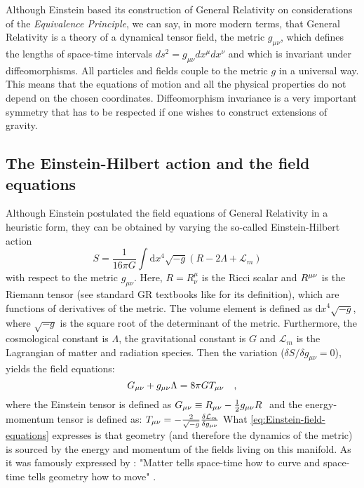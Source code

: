 Although Einstein based its construction of General Relativity on considerations of the \emph{Equivalence Principle},  we can say, in more modern terms, that General Relativity is a theory of 
a dynamical tensor field, the metric $g_{\mu \nu}$, which defines the lengths 
of space-time intervals $ds^2 = g_{\mu \nu} dx^{\mu} dx^{\nu}$ and which is invariant under diffeomorphisms. 
All particles and fields couple to the metric $g$ in a universal way.
This means that the equations of motion and all the physical properties do not depend on the chosen coordinates.
Diffeomorphism invariance is a very important symmetry that has to be respected if one wishes to construct
extensions of gravity. 



\subsection{The Einstein-Hilbert action and the field equations \label{sub:Einstein-Hilbert}}

Although Einstein postulated the field equations of General Relativity in a heuristic
form, they can be obtained by varying the so-called Einstein-Hilbert action
\begin{equation}\label{eq:Einstein-Hilbert action}
S = \frac{1}{16 \pi G} \int \textrm{d}x^4 \sqrt{-g}\left( R - 2\Lambda + \mathcal{L}_m \right) \quad 
\end{equation}
with respect to the metric $g_{\mu \nu}$.
Here, $R=R^\mu_\nu$ is the Ricci scalar and $R^{\mu \nu}$ is the Riemann tensor (see standard GR textbooks like \cite{wald} for its definition), 
which are functions of derivatives of the metric. The volume element is defined as $\textrm{d}x^4 \sqrt{-g}$, where
$\sqrt{-g}$ is the square root of the determinant of the metric.
Furthermore, the cosmological constant is $\Lambda$, the gravitational constant is $G$ and $\mathcal{L}_m $ is the Lagrangian of matter and radiation species.
Then the variation ($\delta S / \delta g_{\mu \nu} = 0$), yields the field equations:
\begin{equation}\label{eq:Einstein-field-equations}
G_{\mu \nu} + g_{\mu \nu} \Lambda = 8 \pi G T_{\mu \nu} \quad ,
\end{equation}
where the Einstein tensor is defined as $G_{\mu \nu} \equiv R_{\mu \nu} - \frac{1}{2}g_{\mu \nu} R \;$ and the 
energy-momentum tensor is defined as:
\beeqp$
T_{\mu \nu} = -\frac{2}{\sqrt{-g}} \frac{\delta \mathcal{L}_m}{\delta g_{\mu \nu}}
$
What \cref{eq:Einstein-field-equations} expresses is that geometry (and therefore the dynamics of the metric) is sourced by 
the energy and momentum of the fields living on this manifold.
As it was famously expressed by \cite{Misner, Wheeler, Gravitation}:
"Matter tells space-time how to curve and space-time tells geometry how to move" .


